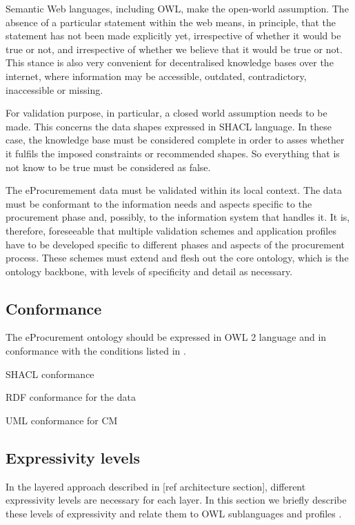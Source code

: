 	Semantic Web languages, including OWL, make the open-world assumption. The absence of a particular statement within the web means, in principle, that the statement has not been made explicitly yet, irrespective of whether it would be true or not, and irrespective of whether we believe that it would be true or not. This stance is also very convenient for decentralised knowledge bases over the internet, where information may be accessible, outdated, contradictory, inaccessible or missing\cite{damasio2006supporting}. 
	
	For validation purpose, in particular, a closed world assumption needs to be made. This concerns the data shapes expressed in SHACL language. In these case, the knowledge base must be considered complete in order to asses whether it fulfils the imposed constraints or recommended shapes. So everything that is not know to be true must be considered as false. 
	
	The eProcuremement data must be validated within its local context. The data must be conformant to the information needs and aspects specific to the procurement phase and, possibly, to the information system that handles it. It is, therefore, foreseeable that multiple validation schemes and application profiles have to be developed specific to different phases and aspects of the procurement process. These schemes must extend and flesh out the core ontology, which is the ontology backbone, with levels of specificity and detail as necessary. 

	\subsection{Conformance}
	
	The eProcurement ontology should be expressed in OWL 2 language and in conformance with the conditions listed in \citet{owl2-comformance}.
	
	SHACL conformance
	
	RDF conformance for the data
	
	UML conformance for CM
	
	\subsection{Expressivity levels}
	\label{sec:expressivity}

	In the layered approach described in [ref architecture section], different expressivity levels are necessary for each layer. In this section we briefly describe these levels of expressivity and relate them to OWL sublanguages \citep{owl1} and profiles \citep{owl2-profiles}.
	
